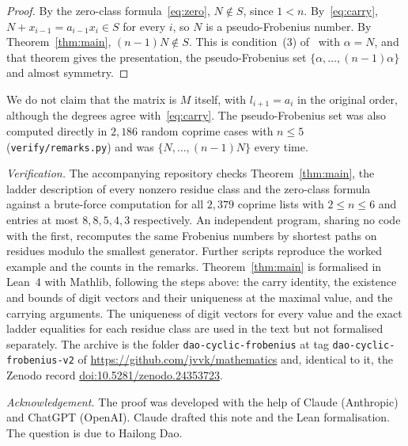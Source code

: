 \documentclass[11pt]{amsart}
\theoremstyle{remark}
\begin{document}
\begin{proof}
By the zero-class formula~\eqref{eq:zero}, $N\notin S$, since $1<n$. By~\eqref{eq:carry}, $N+x_{i-1}=a_{i-1}x_i\in S$ for every $i$, so $N$ is a pseudo-Frobenius number. By Theorem~\ref{thm:main}, $(n-1)N\notin S$. This is condition~(3) of~\cite[Theorem~1.2]{GKMT} with $\alpha=N$, and that theorem gives the presentation, the pseudo-Frobenius set $\{\alpha,\dots,(n-1)\alpha\}$ and almost symmetry.
\end{proof}

We do not claim that the matrix is $M$ itself, with $l_{i+1}=a_i$ in the original order, although the degrees agree with~\eqref{eq:carry}. The pseudo-Frobenius set was also computed directly in $2{,}186$ random coprime cases with $n\le5$ (\texttt{verify/remarks.py}) and was $\{N,\dots,(n-1)N\}$ every time.

\emph{Verification.} The accompanying repository checks Theorem~\ref{thm:main}, the ladder description of every nonzero residue class and the zero-class formula against a brute-force computation for all $2{,}379$ coprime lists with $2\le n\le6$ and entries at most $8,8,5,4,3$ respectively. An independent program, sharing no code with the first, recomputes the same Frobenius numbers by shortest paths on residues modulo the smallest generator. Further scripts reproduce the worked example and the counts in the remarks. Theorem~\ref{thm:main} is formalised in Lean~4 with Mathlib, following the steps above: the carry identity, the existence and bounds of digit vectors and their uniqueness at the maximal value, and the carrying arguments. The uniqueness of digit vectors for every value and the exact ladder equalities for each residue class are used in the text but not formalised separately. The archive is the folder \texttt{dao-cyclic-frobenius} at tag \texttt{dao-cyclic-frobenius-v2} of \url{https://github.com/jvvk/mathematics} and, identical to it, the Zenodo record \href{https://doi.org/10.5281/zenodo.24353723}{doi:10.5281/zenodo.24353723}.

\emph{Acknowledgement.} The proof was developed with the help of Claude (Anthropic) and ChatGPT (OpenAI). Claude drafted this note and the Lean formalisation. The question is due to Hailong Dao.
\end{document}
